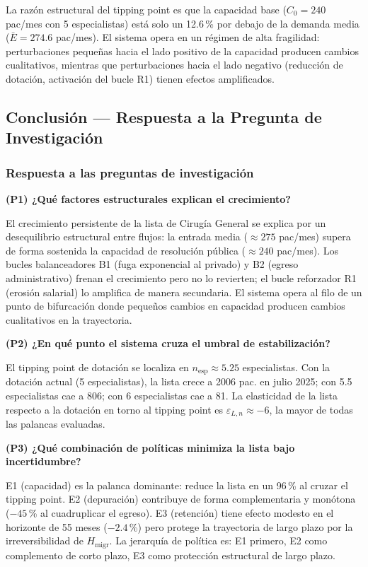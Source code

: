 \documentclass[12pt,a4paper]{article}
\begin{document}
La razón estructural del tipping point es que la capacidad base ($C_0 = 240$ pac/mes con 5 especialistas) está solo un 12.6\,\% por debajo de la demanda media ($\bar{E} = 274.6$ pac/mes). El sistema opera en un régimen de alta fragilidad: perturbaciones pequeñas hacia el lado positivo de la capacidad producen cambios cualitativos, mientras que perturbaciones hacia el lado negativo (reducción de dotación, activación del bucle R1) tienen efectos amplificados.

\subsection{Conclusión — Respuesta a la Pregunta de Investigación}

\subsubsection*{Respuesta a las preguntas de investigación}

\textbf{(P1) ¿Qué factores estructurales explican el crecimiento?}

El crecimiento persistente de la lista de Cirugía General se explica por un desequilibrio estructural entre flujos: la entrada media ($\approx 275$ pac/mes) supera de forma sostenida la capacidad de resolución pública ($\approx 240$ pac/mes). Los bucles balanceadores B1 (fuga exponencial al privado) y B2 (egreso administrativo) frenan el crecimiento pero no lo revierten; el bucle reforzador R1 (erosión salarial) lo amplifica de manera secundaria. El sistema opera al filo de un punto de bifurcación donde pequeños cambios en capacidad producen cambios cualitativos en la trayectoria.

\textbf{(P2) ¿En qué punto el sistema cruza el umbral de estabilización?}

El tipping point de dotación se localiza en $n_{\text{esp}} \approx 5.25$ especialistas. Con la dotación actual (5 especialistas), la lista crece a 2006 pac. en julio 2025; con 5.5 especialistas cae a 806; con 6 especialistas cae a 81. La elasticidad de la lista respecto a la dotación en torno al tipping point es $\varepsilon_{L,n} \approx -6$, la mayor de todas las palancas evaluadas.

\textbf{(P3) ¿Qué combinación de políticas minimiza la lista bajo incertidumbre?}

E1 (capacidad) es la palanca dominante: reduce la lista en un 96\,\% al cruzar el tipping point. E2 (depuración) contribuye de forma complementaria y monótona ($-45$\,\% al cuadruplicar el egreso). E3 (retención) tiene efecto modesto en el horizonte de 55 meses ($-2.4$\,\%) pero protege la trayectoria de largo plazo por la irreversibilidad de $H_{\text{migr}}$. La jerarquía de política es: E1 primero, E2 como complemento de corto plazo, E3 como protección estructural de largo plazo.
\end{document}
